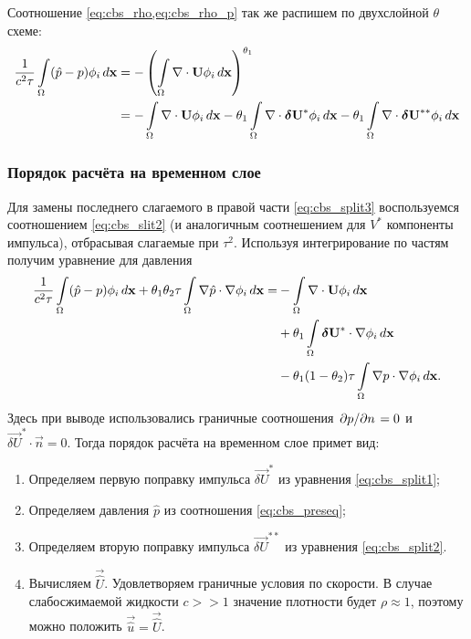 Соотношение \cref{eq:cbs_rho,eq:cbs_rho_p}
так же распишем по двухслойной $\theta$ схеме:
\begin{equation}
\label{eq:cbs_split3}
\begin{split}
\frac1{c^2\tau}\int\limits_{\Omega}(\hat p - p)\phi_i \, d \boldsymbol{\rm x}
&
= -\left(\int\limits_{\Omega}\nabla\cdot \boldsymbol{\rm U} \phi_i \, d \boldsymbol{\rm x}\right)^{\theta_1}
\\
&
=-\int\limits_{\Omega}\nabla\cdot \boldsymbol{\rm U} \phi_i \, d \boldsymbol{\rm x}
 -\theta_1 \int\limits_{\Omega}\nabla\cdot \boldsymbol{\rm \delta U}^* \phi_i \, d \boldsymbol{\rm x}
 -\theta_1 \int\limits_{\Omega}\nabla\cdot \boldsymbol{\rm \delta U}^{**} \phi_i \, d \boldsymbol{\rm x}
\end{split}
\end{equation}

\subsubsection{Порядок расчёта на временном слое}
Для замены последнего слагаемого в правой части \cref{eq:cbs_split3}
воспользуемся соотношением \cref{eq:cbs_slit2} (и аналогичным соотнешением для $V^{*}$ компоненты импульса),
отбрасывая слагаемые при $\tau^2$.
Используя интегрирование по частям получим уравнение для давления
\begin{equation}
\label{eq:cbs_preseq}
\begin{split}
\frac1{c^2\tau}\int\limits_{\Omega}(\hat p - p)\phi_i \, d \boldsymbol{\rm x}
 +\theta_1 \theta_2 \tau \int\limits_{\Omega}\nabla \hat p \cdot \nabla \phi_i \, d \boldsymbol{\rm x}
=
&
-\int\limits_{\Omega}\nabla\cdot \boldsymbol{\rm U} \phi_i \, d \boldsymbol{\rm x}
\\
&
 +\theta_1 \int\limits_{\Omega}\boldsymbol{\rm \delta U}^* \cdot \nabla \phi_i \, d \boldsymbol{\rm x}
\\
&
 -\theta_1 (1 - \theta_2)\tau\int\limits_{\Omega}\nabla p \cdot \nabla \phi_i \, d \boldsymbol{\rm x}.
\end{split}
\end{equation}
Здесь при выводе использовались граничные соотношения $\left.\partial p\middle/\partial n\right. = 0$ и $\vec {\delta U}^* \cdot \vec n = 0$.
Тогда порядок расчёта на временном слое примет вид:
\begin{enumerate}
\item
Определяем первую поправку импульса $\vec{\delta U}^*$ из уравнения \cref{eq:cbs_split1};
\item
Определяем давления $\hat p$ из соотношения \cref{eq:cbs_preseq};
\item
Определяем вторую поправку импульса $\vec{\delta U}^{**}$ из уравнения \cref{eq:cbs_split2}.
\item
Вычисляем $\vec{\hat U}$. Удовлетворяем граничные условия по скорости. В случае слабосжимаемой жидкости $c >> 1$ значение плотности
будет $\rho \approx 1$, поэтому можно положить $\vec {\hat u} = \vec {\hat U}$.
\end{enumerate}

